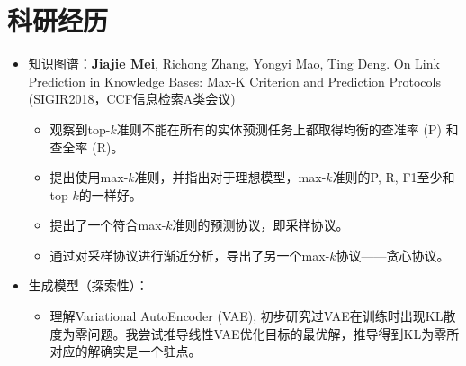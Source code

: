 \documentclass{resume}
\begin{document}
\section{科研经历}
\begin{itemize}
	\item 知识图谱：{\bf Jiajie Mei}, Richong Zhang, Yongyi Mao, Ting Deng. On Link Prediction in Knowledge Bases: Max-K Criterion and Prediction Protocols (SIGIR2018，CCF信息检索A类会议)
	\begin{itemize}
		\item 观察到top-$k$准则不能在所有的实体预测任务上都取得均衡的查准率 (P) 和查全率 (R)。
		\item 提出使用max-$k$准则，并指出对于理想模型，max-$k$准则的P, R, F1至少和top-$k$的一样好。
		\item 提出了一个符合max-$k$准则的预测协议，即采样协议。
		\item 通过对采样协议进行渐近分析，导出了另一个max-$k$协议——贪心协议。
	\end{itemize}
\item 生成模型（探索性）：
\begin{itemize}
	\item 理解Variational AutoEncoder (VAE), 初步研究过VAE在训练时出现KL散度为零问题。我尝试推导线性VAE优化目标的最优解，推导得到KL为零所对应的解确实是一个驻点。
\end{itemize}


\end{itemize}
\end{document}
